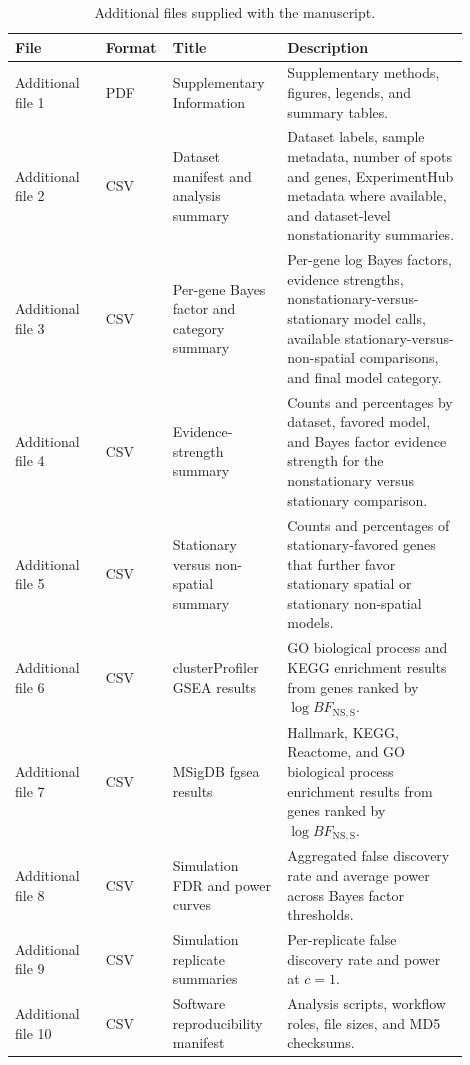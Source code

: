 \begin{table}[htbp]
\centering
\small
\caption{Additional files supplied with the manuscript.}\label{tab:additional-files}
\begin{tabular}{p{0.19\linewidth}p{0.09\linewidth}p{0.24\linewidth}p{0.38\linewidth}}
\toprule
File & Format & Title & Description\\
\midrule
Additional file 1 & PDF & Supplementary Information & Supplementary methods, figures, legends, and summary tables.\\
Additional file 2 & CSV & Dataset manifest and analysis summary & Dataset labels, sample metadata, number of spots and genes, ExperimentHub metadata where available, and dataset-level nonstationarity summaries.\\
Additional file 3 & CSV & Per-gene Bayes factor and category summary & Per-gene log Bayes factors, evidence strengths, nonstationary-versus-stationary model calls, available stationary-versus-non-spatial comparisons, and final model category.\\
Additional file 4 & CSV & Evidence-strength summary & Counts and percentages by dataset, favored model, and Bayes factor evidence strength for the nonstationary versus stationary comparison.\\
Additional file 5 & CSV & Stationary versus non-spatial summary & Counts and percentages of stationary-favored genes that further favor stationary spatial or stationary non-spatial models.\\
Additional file 6 & CSV & clusterProfiler GSEA results & GO biological process and KEGG enrichment results from genes ranked by \(\log BF_{\mathrm{NS,S}}\).\\
Additional file 7 & CSV & MSigDB fgsea results & Hallmark, KEGG, Reactome, and GO biological process enrichment results from genes ranked by \(\log BF_{\mathrm{NS,S}}\).\\
Additional file 8 & CSV & Simulation FDR and power curves & Aggregated false discovery rate and average power across Bayes factor thresholds.\\
Additional file 9 & CSV & Simulation replicate summaries & Per-replicate false discovery rate and power at \(c=1\).\\
Additional file 10 & CSV & Software reproducibility manifest & Analysis scripts, workflow roles, file sizes, and MD5 checksums.\\
\bottomrule
\end{tabular}
\end{table}

